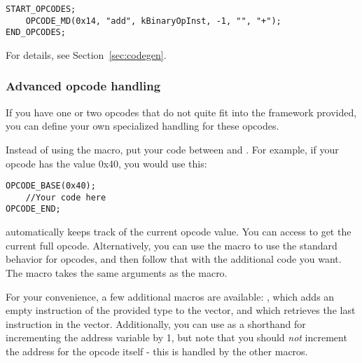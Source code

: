 \begin{C++}
\begin{lstlisting}
START_OPCODES;
	OPCODE_MD(0x14, "add", kBinaryOpInst, -1, "", "+");
END_OPCODES;
\end{lstlisting}
\end{C++}

For details, see Section~\vref{sec:codegen}.

\subsubsection{Advanced opcode handling}
If you have one or two opcodes that do not quite fit into the framework provided, you can define your own specialized handling for these opcodes.

Instead of using the  macro, put your code between  and . For example, if your opcode has the value 0x40, you would use this:

\begin{C++}
\begin{lstlisting}
OPCODE_BASE(0x40);
	//Your code here
OPCODE_END;
\end{lstlisting}
\end{C++}

 automatically keeps track of the current opcode value. You can access  to get the current full opcode. Alternatively, you can use the  macro to use the standard behavior for opcodes, and then follow that with the additional code you want. The  macro takes the same arguments as the  macro.

For your convenience, a few additional macros are available: , which adds an empty instruction of the provided type to the vector, and  which retrieves the last instruction in the vector. Additionally, you can use  as a shorthand for incrementing the address variable by 1, but note that you should \emph{not} increment the address for the opcode itself - this is handled by the other macros.
